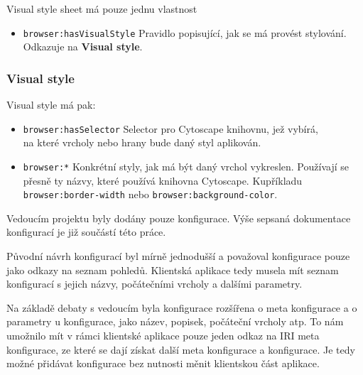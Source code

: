 Visual style sheet má pouze jednu vlastnost

\begin{itemize}
    \item \texttt{browser:hasVisualStyle} Pravidlo popisující, jak se má provést stylování. Odkazuje na \textbf{Visual style}.
\end{itemize}

\subsubsection{Visual style}
Visual style má pak:

\begin{itemize}
    \item \texttt{browser:hasSelector} Selector pro Cytoscape knihovnu, jež vybírá, \\ na které vrcholy nebo hrany bude daný styl aplikován.
    \item \texttt{browser:*} Konkrétní styly, jak má být daný vrchol vykreslen. Používají se přesně ty názvy, které používá knihovna Cytoscape. Kupříkladu \\\texttt{browser:border-width} nebo \texttt{browser:background-color}.
\end{itemize}

\bigskip

Vedoucím projektu byly dodány pouze konfigurace. Výše sepsaná dokumentace konfigurací je již součástí této práce.

Původní návrh konfigurací byl mírně jednodušší a považoval konfigurace pouze jako odkazy na seznam pohledů. Klientská aplikace tedy musela mít seznam konfigurací s jejich názvy, počátečními vrcholy a dalšími parametry.

Na základě debaty s vedoucím byla konfigurace rozšířena o meta konfigurace a o parametry u konfigurace, jako název, popisek, počáteční vrcholy atp. To nám umožnilo mít v rámci klientské aplikace pouze jeden odkaz na IRI meta konfigurace, ze které se dají získat další meta konfigurace a konfigurace. Je tedy možné přidávat konfigurace bez nutnosti měnit klientskou část aplikace.

\bigskip

